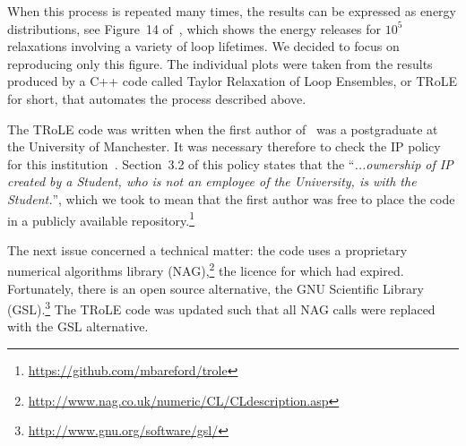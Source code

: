 When this process is repeated many times, the results can be expressed as energy distributions, see Figure~14 of~\cite{bareford2010nanoflare}, which shows the energy releases for $10^5$ relaxations involving a variety of loop lifetimes. We decided to focus on reproducing only this figure. The individual plots were taken from the results produced by a C++ code called Taylor Relaxation of Loop Ensembles, or TRoLE for short, that automates the process described above.

The TRoLE code was written when the first author of~\cite{bareford2010nanoflare}
was a postgraduate at the University of Manchester. It was necessary therefore
to check the IP policy for this
institution~\cite{manchester:ipr}.
Section~3.2 of this policy states that the ``\emph{...ownership of IP created by
a Student, who is not an employee of the University, is with the Student.}'',
which we took to mean that the first author was free to place the code in a
publicly available
repository.\footnote{\url{https://github.com/mbareford/trole}}

The next issue concerned a technical matter: the code uses
a proprietary numerical algorithms library
(NAG),\footnote{\url{http://www.nag.co.uk/numeric/CL/CLdescription.asp}} the
licence for which had expired. Fortunately, there is an open source alternative,
the GNU Scientific Library
(GSL).\footnote{\url{http://www.gnu.org/software/gsl/}} The TRoLE code was updated such that all NAG calls were replaced with the GSL alternative. 

% 

